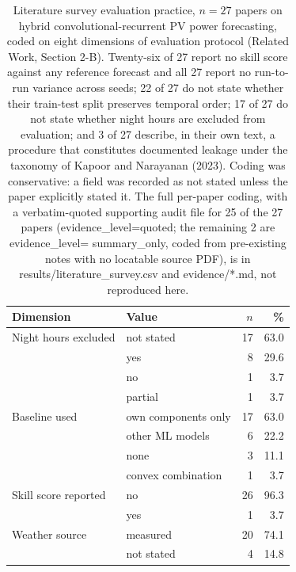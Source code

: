 \begin{table}[t]
  \centering
  \footnotesize
  \caption{Literature survey evaluation practice, $n=27$ papers on
  hybrid convolutional-recurrent PV power forecasting, coded on eight
  dimensions of evaluation protocol (Related Work, Section 2-B).
  Twenty-six of 27 report no skill score against any reference forecast
  and all 27 report no run-to-run variance across seeds; 22 of 27 do not
  state whether their train-test split preserves temporal order; 17 of
  27 do not state whether night hours are excluded from evaluation; and
  3 of 27 describe, in their own text, a procedure that constitutes
  documented leakage under the taxonomy of Kapoor and Narayanan (2023).
  Coding was conservative: a field was recorded as not stated unless the
  paper explicitly stated it. The full per-paper coding, with a
  verbatim-quoted supporting audit file for 25 of the 27 papers
  (evidence\_level=quoted; the remaining 2 are evidence\_level=
  summary\_only, coded from pre-existing notes with no locatable source
  PDF), is in results/literature\_survey.csv and evidence/*.md, not
  reproduced here.}
  \label{tab:T8}
  \begin{tabular}{llrr}
    \toprule
    Dimension & Value & $n$ & \% \\
    \midrule
    Night hours excluded & not stated & 17 & 63.0 \\
     & yes & 8 & 29.6 \\
     & no & 1 & 3.7 \\
     & partial & 1 & 3.7 \\
    \addlinespace
    Baseline used & own components only & 17 & 63.0 \\
     & other ML models & 6 & 22.2 \\
     & none & 3 & 11.1 \\
     & convex combination & 1 & 3.7 \\
    \addlinespace
    Skill score reported & no & 26 & 96.3 \\
     & yes & 1 & 3.7 \\
    \addlinespace
    Weather source & measured & 20 & 74.1 \\
     & not stated & 4 & 14.8 \\

\end{tabular}
\end{table}
